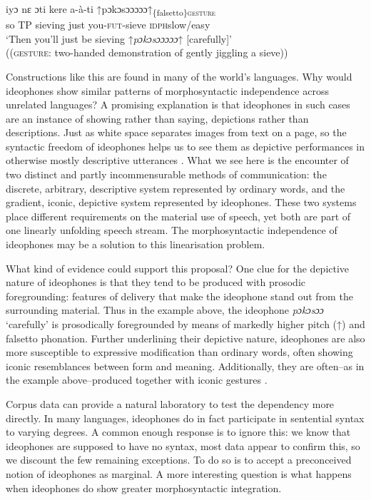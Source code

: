 \documentclass[output=paper]{langsci/langscibook}
\begin{document}
\ea
\gll   iyɔ  nɛ  ɔti  kere  a-à-\textup{{\textbar}}ti  ↑pɔkɔsɔɔɔɔɔ↑\textup{\textsubscript{\{falsetto\}}}\textup{ {\textbar}}\textsc{\textsubscript{gesture}}\\
  {{so}}  TP  {{sieving}}  {{just}}  {you-\textsc{fut}-sieve}  {\textsc{idph}}{{slow/easy}}\\
\glt ‘Then you’ll just be sieving ↑\textit{pɔkɔsɔɔɔɔɔ}↑ [carefully]’ \\
((\textsc{gesture}: two-handed demonstration of gently jiggling a sieve))
\z



  Constructions like this are found in many of the world’s languages. Why would ideophones show similar patterns of morphosyntactic independence across unrelated languages? A promising explanation is that ideophones in such cases are an instance of showing rather than saying, depictions  rather than descriptions. Just as white space separates images from text on a page, so the syntactic freedom of ideophones helps us to see them as depictive performances in otherwise mostly descriptive utterances \citep{Kunene1965}. What we see here is the encounter of two distinct and partly incommensurable methods of communication: the discrete, arbitrary, descriptive system represented by ordinary words, and the gradient, iconic,  depictive system represented by ideophones. These two systems place different requirements on the material use of speech, yet both are part of one linearly unfolding speech stream. The morphosyntactic independence of ideophones may be a solution to this linearisation problem. 



What kind of evidence could support this proposal? One clue for the depictive nature of ideophones is that they tend to be produced with prosodic foregrounding: features of delivery that make the ideophone stand out from the surrounding material. Thus in the  example above, the ideophone \textit{pɔkɔsɔɔ} ‘carefully’ is prosodically foregrounded by means of markedly higher pitch (↑) and falsetto phonation. Further underlining their depictive nature, ideophones are also more susceptible to expressive modification than ordinary words, often showing iconic resemblances between form and meaning. Additionally, they are often--as in the example above--produced together with iconic gestures \citep{Nuckolls1996}.   



 Corpus data can provide a natural laboratory to test the dependency more directly. In many languages, ideophones do in fact participate in sentential syntax to varying degrees. A common enough response is to ignore this: we know that ideophones are supposed to have no syntax, most data appear to confirm this, so we discount the few remaining exceptions. To do so is to accept a preconceived notion of ideophones as marginal. A more interesting question is what happens when ideophones do show greater morphosyntactic integration. 
\end{document}
